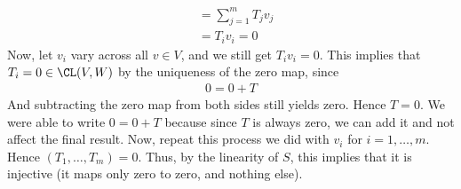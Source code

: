 \documentclass{book}
\begin{document}
\begin{enumerate}[label=\arabic*)]
\begin{align*}
        & = \sum_{j = 1}^{m}T_jv_j \\
        & = T_iv_i = 0
      \end{align*}
      Now, let $v_i$ vary across all $v \in V$, and we still get $T_iv_i = 0$. This implies that $T_i = 0 \in \CL(V, W)$ by the uniqueness of the zero map, since
      \begin{align*}
        0 = 0 + T
      \end{align*}
      And subtracting the zero map from both sides still yields zero. Hence $T = 0$. We were able to write $0 = 0 + T$ because since $T$ is always zero, we can add it and not affect the
      final result. Now, repeat this process we did with $v_i$ for $i = 1, \dots, m$. Hence $(T_1, \dots, T_m) = 0$. Thus, by the linearity of $S$, this implies that it is injective (it maps
      only zero to zero, and nothing else). 


\end{enumerate}
\end{document}
